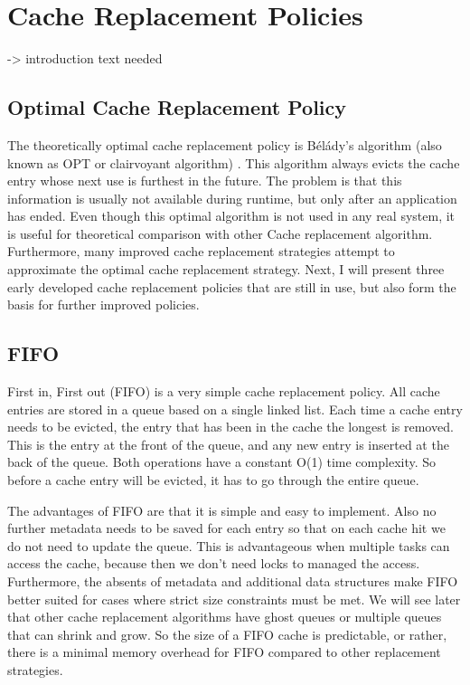 \documentclass[
	12pt,
	a4paper,
	abstract,
	bibliography=totoc,
	chapterprefix,
	headings=openright,
	numbers=endperiod,
	parskip=half,
	twoside,
]{scrreprt}
\begin{document}
\section{Cache Replacement Policies}

-> introduction text needed

\subsection{Optimal Cache Replacement Policy}
The theoretically optimal cache replacement policy is Bélády's algorithm (also known as OPT or clairvoyant algorithm) \cite{belady1966study}.
This algorithm always evicts the cache entry whose next use is furthest in the future.
The problem is that this information is usually not available during runtime, but only after an application has ended.
Even though this optimal algorithm is not used in any real system, it is useful for theoretical comparison with other 
Cache replacement algorithm.
Furthermore, many improved cache replacement strategies attempt to approximate the optimal cache replacement strategy.
Next, I will present three early developed cache replacement policies that are still in use, but also form the basis for further improved policies.


\subsection{FIFO}

First in, First out (FIFO) is a very simple cache replacement policy.
All cache entries are stored in a queue based on a single linked list.
Each time a cache entry needs to be evicted, the entry that has been in the cache the longest is removed.
This is the entry at the front of the queue, and any new entry is inserted at the back of the queue. Both operations have a constant O(1) time complexity.
So before a cache entry will be evicted, it has to go through the entire queue.

The advantages of FIFO are that it is simple and easy to implement.
Also no further metadata needs to be saved for each entry so that on each cache hit we do not need to update the queue.
This is advantageous when multiple tasks can access the cache, because then 
we don't need locks to managed the access.
Furthermore, the absents of metadata and additional data structures make FIFO better suited for cases where strict size constraints must be met. 
We will see later that other cache replacement algorithms have ghost queues or multiple queues that can shrink and grow. So the size 
of a FIFO cache is predictable, or rather, there is a minimal memory overhead for FIFO compared to other replacement strategies.
\end{document}
